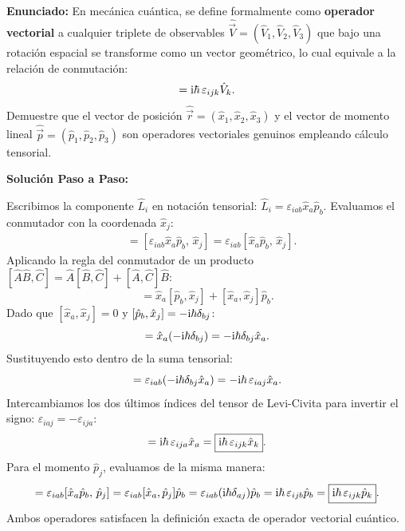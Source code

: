 \begin{ejemplobox}
    \textbf{Enunciado:} En mecánica cuántica, se define formalmente como \textbf{operador vectorial} a cualquier triplete de observables $\hat{\vec{V}} = (\hat{V}_1, \hat{V}_2, \hat{V}_3)$ que bajo una rotación espacial se transforme como un vector geométrico, lo cual equivale a la relación de conmutación:
    \begin{equation}
        [\hat{L}_i, \hat{V}_j] = \iu\hbar\,\varepsilon_{ijk}\hat{V}_k.
    \end{equation}
    Demuestre que el vector de posición $\hat{\vec{r}} = (\hat{x}_1, \hat{x}_2, \hat{x}_3)$ y el vector de momento lineal $\hat{\vec{p}} = (\hat{p}_1, \hat{p}_2, \hat{p}_3)$ son operadores vectoriales genuinos empleando cálculo tensorial.

    \textbf{Solución Paso a Paso:}
    
    Escribimos la componente $\hat{L}_i$ en notación tensorial: $\hat{L}_i = \varepsilon_{iab}\hat{x}_a\hat{p}_b$. Evaluamos el conmutador con la coordenada $\hat{x}_j$:
    \begin{align}
        [\hat{L}_i, \hat{x}_j] &= [\varepsilon_{iab}\hat{x}_a\hat{p}_b, \, \hat{x}_j] = \varepsilon_{iab}[\hat{x}_a\hat{p}_b, \, \hat{x}_j].
    \end{align}
    Aplicando la regla del conmutador de un producto $[\hat{A}\hat{B}, \hat{C}] = \hat{A}[\hat{B}, \hat{C}] + [\hat{A}, \hat{C}]\hat{B}$:
    \begin{equation}
        [\hat{x}_a\hat{p}_b, \, \hat{x}_j] = \hat{x}_a[\hat{p}_b, \hat{x}_j] + [\hat{x}_a, \hat{x}_j]\hat{p}_b.
    \end{equation}
    Dado que $[\hat{x}_a, \hat{x}_j] = 0$ y $[\hat{p}_b, \hat{x}_j] = -\mathrm{i}\hbar\delta_{bj}$:
    \begin{equation}
        [\hat{x}_a\hat{p}_b, \, \hat{x}_j] = \hat{x}_a(-\iu\hbar\delta_{bj}) = -\iu\hbar\delta_{bj}\hat{x}_a.
    \end{equation}
    Sustituyendo esto dentro de la suma tensorial:
    \begin{equation}
        [\hat{L}_i, \hat{x}_j] = \varepsilon_{iab}(-\iu\hbar\delta_{bj}\hat{x}_a) = -\iu\hbar\,\varepsilon_{iaj}\hat{x}_a.
    \end{equation}
    Intercambiamos los dos últimos índices del tensor de Levi-Civita para invertir el signo: $\varepsilon_{iaj} = -\varepsilon_{ija}$:
    \begin{equation}
        [\hat{L}_i, \hat{x}_j] = \iu\hbar\,\varepsilon_{ija}\hat{x}_a = \boxed{\iu\hbar\,\varepsilon_{ijk}\hat{x}_k}.
    \end{equation}
    Para el momento $\hat{p}_j$, evaluamos de la misma manera:
    \begin{equation}
        [\hat{L}_i, \hat{p}_j] = \varepsilon_{iab}[\hat{x}_a\hat{p}_b, \, \hat{p}_j] = \varepsilon_{iab}[\hat{x}_a, \hat{p}_j]\hat{p}_b = \varepsilon_{iab}(\iu\hbar\delta_{aj})\hat{p}_b = \iu\hbar\,\varepsilon_{ijb}\hat{p}_b = \boxed{\iu\hbar\,\varepsilon_{ijk}\hat{p}_k}.
    \end{equation}
    Ambos operadores satisfacen la definición exacta de operador vectorial cuántico.
\end{ejemplobox}

